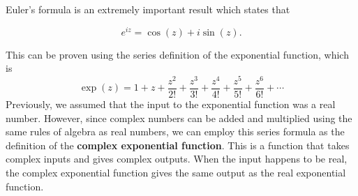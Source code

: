\documentclass[10pt,a4paper]{article}
\begin{document}
Euler's formula is an extremely important result which states that

\begin{framed}
  \begin{equation}
    e^{iz} = \cos(z) + i \sin(z).
  \end{equation}
\end{framed}

This can be proven using the series definition of the exponential
function, which is
\begin{equation}
\exp(z) = 1 + z + \frac{z^2}{2!} + \frac{z^3}{3!} + \frac{z^4}{4!} + \frac{z^5}{5!} + \frac{z^6}{6!} + \cdots
\end{equation}
Previously, we assumed that the input to the exponential function was a
real number. However, since complex numbers can be added and multiplied
using the same rules of algebra as real numbers, we can employ this
series formula as the definition of the \textbf{complex exponential
function}. This is a function that takes complex inputs and gives
complex outputs. When the input happens to be real, the complex
exponential function gives the same output as the real exponential
function.
\end{document}
